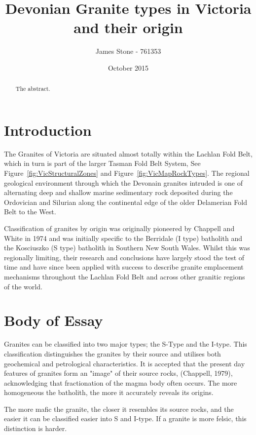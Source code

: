 \documentclass[a4paper]{article}
\title{Devonian Granite types in Victoria and their origin}
\author{James Stone - 761353}
\date{October 2015}
\begin{document}
\maketitle
\newpage

\begin{abstract}
The abstract.
\end{abstract}

\section{Introduction}

The Granites of Victoria are situated almost totally within the Lachlan Fold Belt, which in turn is part of the larger Tasman Fold Belt System, See Figure~\ref{fig:VicStructuralZones} and  Figure~\ref{fig:VicMapRockTypes}. The regional geological environment through which the Devonain granites intruded is one of alternating deep and shallow marine sedimentary rock deposited during the Ordovician and Silurian along the continental edge of the older Delamerian Fold Belt to the West.

Classification of granites by origin was originally pioneered by Chappell and White in 1974 and was initially specific to the Berridale (I type) batholith and the Kosciuszko (S type) batholith in Southern New South Wales. Whilst this was regionally limiting, their research and conclusions have largely stood the test of time and have since been applied with success to describe granite emplacement mechanisms throughout the Lachlan Fold Belt and across other granitic regions of the world.

\section{Body of Essay}
\label{sec:Body of Essay}



Granites can be classified into two major types; the S-Type and the I-type. \cite{BWChappell}
This classification distinguishes the granites by their source and utilises both geochemical and petrological characteristics. It is accepted that the present day features of granites form an "image" of their source rocks, \cite{BWChappell} (Chappell, 1979), acknowledging that fractionation of the magma body often occurs. The more homogeneous the batholith, the more it accurately reveals its origins. 

The more mafic the granite, the closer it resembles its source rocks, and the easier it can be classified easier into S and I-type. If a granite is more felsic, this distinction is harder.   
\end{document}
